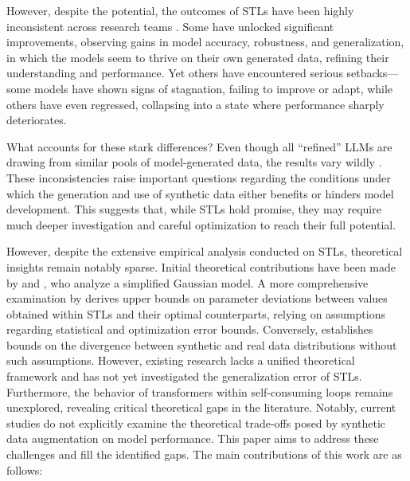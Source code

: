 However, despite the potential, the outcomes of STLs have been highly inconsistent across research teams \citep{shumailov2024ai,alemohammadself,bertrandstability}. Some \citep{gerstgrasser2024is, bertrandstability, gillmanself} have unlocked significant improvements, observing gains in model accuracy, robustness, and generalization, in which the models seem to thrive on their own generated data, refining their understanding and performance. Yet others \citep{shumailov2024ai,alemohammadself} have encountered serious setbacks—some models have shown signs of stagnation, failing to improve or adapt, while others have even regressed, collapsing into a state where performance sharply deteriorates.


What accounts for these stark differences? Even though all “refined” LLMs are drawing from similar pools of model-generated data, the results vary wildly \citep{briesch2023large}. These inconsistencies raise important questions regarding the conditions under which the generation and use of synthetic data either benefits or hinders model development. This suggests that, while STLs hold promise, they may require much deeper investigation and careful optimization to reach their full potential. %

However, despite the extensive empirical analysis conducted on STLs, theoretical insights remain notably sparse. Initial theoretical contributions have been made by \citep{shumailov2024ai} and \cite{alemohammadself}, who analyze a simplified Gaussian model. A more comprehensive examination by \cite{bertrandstability} derives upper bounds on parameter deviations between values obtained within STLs and their optimal counterparts, relying on assumptions regarding statistical and optimization error bounds. Conversely, \cite{futowards} establishes bounds on the divergence between synthetic and real data distributions without such assumptions. However, existing research lacks a unified theoretical framework and has not yet investigated the generalization error of STLs. Furthermore, the behavior of transformers within self-consuming loops remains unexplored, revealing critical theoretical gaps in the literature. Notably, current studies do not explicitly examine the theoretical trade-offs posed by synthetic data augmentation on model performance. This paper aims to address these challenges and fill the identified gaps. The main contributions of this work are as follows:











